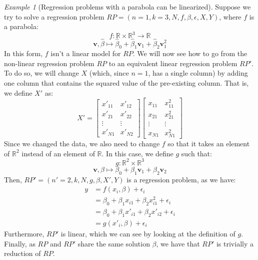 \documentclass{article}
\theoremstyle{definition}
\theoremstyle{remark}
\theoremstyle{example}
\newtheorem{example}{Example}[section]
\newcommand{\vv}{\mathbf{v}}
\newcommand{\betat}{\hat{\beta}}
\begin{document}
\begin{example}[Regression problems with a parabola can be linearized]
		Suppose we try to solve a regression problem $RP = (n=1, k=3, N, f, \beta, \epsilon, X, Y)$, where $f$ is a parabola:
				$$f : \mathbb{R} \times \mathbb{R}^3 \rightarrow \mathbb{R}$$
				$$\vv, \betat \mapsto \betat_0 + \betat_1 \vv_1 + \betat_2 \vv_1^2$$
		In this form, $f$ isn't a linear model for $RP$. We will now see how to go from the non-linear regression problem $RP$ to an equivalent linear regression problem $RP'$. To do so, we will change $X$ (which, since $n=1$, has a single column) by adding one column that contains the squared value of the pre-existing column. That is, we define $X'$ as:
				$$X' = \begin{bmatrix} x'_{11} & x'_{12} \\ x'_{21} & x'_{22} \\ \vdots & \vdots \\ x'_{N1} & x'_{N2} \end{bmatrix} \begin{bmatrix} x_{11} & x_{11}^2 \\ x_{21} & x_{21}^2 \\ \vdots & \vdots \\ x_{N1} & x_{N1}^2 \end{bmatrix}$$
		Since we changed the data, we also need to change $f$ so that it takes an element of $\mathbb{R}^2$ instead of an element of $\mathbb{R}$. In this case, we define $g$ such that:
				$$g : \mathbb{R}^2 \times \mathbb{R}^3$$
				$$\vv, \beta \mapsto \beta_0 + \beta_1 \vv_1 + \beta_2 \vv_2$$
		Then, $RP' = (n'=2, k, N, g, \beta, X', Y)$ is a regression problem, as we have:
		\begin{align*}
				y &= f(x_i, \beta) + \epsilon_i\\
				  &= \beta_0 + \beta_1 x_{i1} + \beta_2 x_{i1}^2 + \epsilon_i\\
				  &= \beta_0 + \beta_1 x'_{i1} + \beta_2 x'_{i2} + \epsilon_i\\
				  &= g(x'_i, \beta) + \epsilon_i
		\end{align*}
		Furthermore, $RP'$ is linear, which we can see by looking at the definition of $g$. Finally, as $RP$ and $RP'$ share the same solution $\beta$, we have that $RP'$ is trivially a reduction of $RP$.
\end{example}
\end{document}
